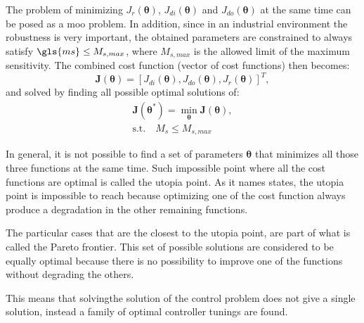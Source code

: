 The problem of minimizing $J_r(\bm{\theta})$, $J_{di}(\bm{\theta})$ and $J_{do}(\bm{\theta})$ at the same time can be posed as a \gls{moo} problem. In addition, since in an industrial environment the robustness is very important, the obtained parameters are constrained to always satisfy  $\gls{ms} \leq M_{s,max}$, where $M_{s,max}$ is the allowed limit of the maximum sensitivity. The combined cost function (vector of cost functions) then becomes:
%
\begin{equation}  %
\textbf{J}(\bm{\theta})=\left[J_{di}(\bm{\theta}), J_{do}(\bm{\theta}), J_{r}(\bm{\theta})\right]^T,
\label{eq:Jtotal}
\end{equation}
%
and solved by finding all possible optimal solutions of:
%
\begin{equation}  %
\begin{gathered}
\textbf{J}(\bm{\theta}^*) = \min_{\bm{\theta}} \textbf{J}(\bm{\theta}),\\
\text{s.t.} \quad  M_s \leq M_{s,max}
\end{gathered}
\label{eq:probmoo}
\end{equation}

In general, it is not possible to find a set of parameters $\bm{\theta}$ that minimizes all those three functions at the same time. Such impossible point where all the cost functions are optimal is called the utopia point. As it names states, the utopia point is impossible to reach because optimizing one of the cost function always produce a degradation in the other remaining functions.

The particular cases that are  the closest to the utopia point, are part of what is called the Pareto frontier. This set of possible solutions are considered to be equally optimal because there is no possibility to improve one of the functions without degrading the others.

This means that solvingthe solution of the control problem does not give a single solution, instead a family of optimal controller tunings are found.

